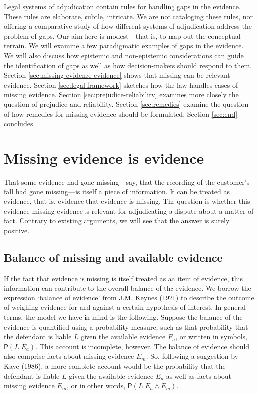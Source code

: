 \documentclass[
  10pt,
  dvipsnames,enabledeprecatedfontcommands]{scrartcl}
\newcommand{\pr}[1]{\mathsf{P}(#1)}
\begin{document}
Legal systems of adjudication contain rules for handling gaps in the
evidence. These rules are elaborate, subtle, intricate. We are not
cataloging these rules, nor offering a comparative study of how
different systems of adjudication address the problem of gaps. Our aim
here is modest---that is, to map out the conceptual terrain. We will
examine a few paradigmatic examples of gaps in the evidence. We will
also discuss how epistemic and non-epistemic considerations can guide
the identification of gaps as well as how decision-makers should respond
to them. Section \ref{sec:missing-evidence-evidence} shows that missing
can be relevant evidence. Section \ref{sec:legal-framework} sketches how
the law handles cases of missing evidence. Section
\ref{sec:prejudice-reliability} examines more closely the question of
prejudice and reliability. Section \ref{sec:remedies} examine the
question of how remedies for missing evidence should be formulated.
Section \ref{sec:end} concludes.

\hypertarget{missing-evidence-is-evidence}{%
\section{Missing evidence is
evidence}\label{missing-evidence-is-evidence}}

\label{sec:missing-evidence-evidence}

That some evidence had gone missing---say, that the recording of the
customer's fall had gone missing---is itself a piece of information. It
can be treated as evidence, that is, evidence that evidence is missing.
The question is whether this evidence-missing evidence is relevant for
adjudicating a dispute about a matter of fact. Contrary to existing
arguments, we will see that the answer is surely positive.

\hypertarget{balance-of-missing-and-available-evidence}{%
\subsection{Balance of missing and available
evidence}\label{balance-of-missing-and-available-evidence}}

If the fact that evidence is missing is itself treated as an item of
evidence, this information can contribute to the overall balance of the
evidence. We borrow the expression `balance of evidence' from J.M.
Keynes (1921) to describe the outcome of weighing evidence for and
against a certain hypothesis of interest. In general terms, the model we
have in mind is the following. Suppose the balance of the evidence is
quantified using a probability measure, such as that probability that
the defendant is liable \(L\) given the available evidence \(E_a\), or
written in symbols, \(\pr{L \vert E_a}\). This account is incomplete,
however. The balance of evidence should also comprise facts about
missing evidence \(E_m\). So, following a suggestion by Kaye (1986), a
more complete account would be the probability that the defendant is
liable \(L\) given the available evidence \(E_a\) as well as facts about
missing evidence \(E_m\), or in other words,
\(\pr{L \vert E_a \wedge E_m}\).
\end{document}
